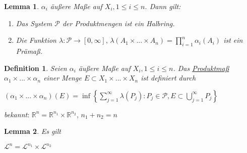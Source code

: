 \documentclass[11pt]{memoir}
\theoremstyle{changebreak}
\newtheorem{Definition}{Definition}[chapter]
\newtheorem{Lemma}{Lemma}[chapter]
\begin{document}
\begin{Lemma}
$\alpha_i$ äußere Maße auf $X_i, 1 \leq i \leq n$. Dann gilt:
\begin{enumerate}
	\item Das System $\mathscr P$ der Produktmengen ist ein Halbring.
	\item Die Funktion $\lambda: \mathscr P \rightarrow [0, \infty], \, \lambda(A_1 \times ... \times A_n) = \prod\limits_{i=1}^n \alpha_i(A_i)$ ist ein Prämaß.
\end{enumerate}
\end{Lemma}

\begin{Definition}
Seien $\alpha_i$ äußere Maße auf $X_i, 1 \leq i \leq n$. Das \underline{Produktmaß} $\alpha_1 \times ... \times \alpha_n$ einer Menge $E \subset X_1 \times ... \times X_n$ ist definiert durch
\begin{center}
	$(\alpha_1 \times ... \times \alpha_n)(E) = \inf\left\{ \sum\limits_{j=1}^\infty \lambda(P_j): P_j \in \mathscr P, E \subset \bigcup\limits_{j=1}^\infty P_j \right\}$

\end{center}
\end{Definition}

\emph{bekannt}:
$\mathbb R^n = \mathbb R^{n_1} \times \mathbb R^{n_2}$, $n_1 + n_2 = n$

\begin{Lemma}
Es gilt
\begin{center}
	$\mathscr L^n = \mathscr L^{n_1} \times \mathscr L^{n_2}$
\end{center}
\end{Lemma}

\end{document}
